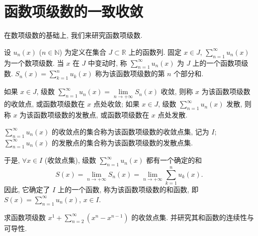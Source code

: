 \section{函数项级数的一致收敛}\label{sec:13.1}

在数项级数的基础上, 我们来研究函数项级数.

\begin{definition}\label{def:13.1.1}
设 $u_{n}(x)$ ($n\in\mathbb{N}$) 为定义在集合 $J\subset\mathbb{R}$ 上的函数列. 固定 $x\in J$, $\sum_{n=1}^{\infty}u_{n}(x)$ 为一个数项级数. 当 $x$ 在 $J$ 中变动时, 称 $\sum_{n=1}^{\infty}u_{n}(x)$ 为 $J$ 上的一个函数项级数. $S_{n}(x)=\sum_{k=1}^{n}u_{k}(x)$ 称为该函数项级数的第 $n$ 个部分和.
\end{definition}

如果 $x\in J$, 级数 $\sum_{n=1}^{\infty}u_{n}(x)=\lim\limits_{n\to+\infty}S_{n}(x)$ 收敛, 则称 $x$ 为该函数项级数的收敛点, 或函数项级数在 $x$ 点处收敛; 如果 $x\in J$, 级数 $\sum_{n=1}^{\infty}u_{n}(x)$ 发散, 则称 $x$ 为该函数项级数的发散点, 或函数项级数在 $x$ 点处发散.

$\sum_{n=1}^{\infty}u_{n}(x)$ 的收敛点的集合称为该函数项级数的收敛点集, 记为 $I$; $\sum_{n=1}^{\infty}u_{n}(x)$ 的发散点的集合称为该函数项级数的发散点集.

于是, $\forall x\in I$ (收敛点集), 级数 $\sum_{n=1}^{\infty}u_{n}(x)$ 都有一个确定的和
\[
  S(x)=\lim_{n\to+\infty}S_{n}(x)=\lim_{n\to+\infty}\sum_{k=1}^{n}u_{k}(x).
\]
因此, 它确定了 $I$ 上的一个函数, 称为该函数项级数的和函数, 即 $S(x)=\sum_{n=1}^{\infty}u_{n}(x)$, $x\in I$.

\begin{example}\label{ex:13.1.1}
求函数项级数 $x^{1}+\sum_{n=2}^{\infty}(x^{n}-x^{n-1})$ 的收敛点集. 并研究其和函数的连续性与可导性.
\end{example}

